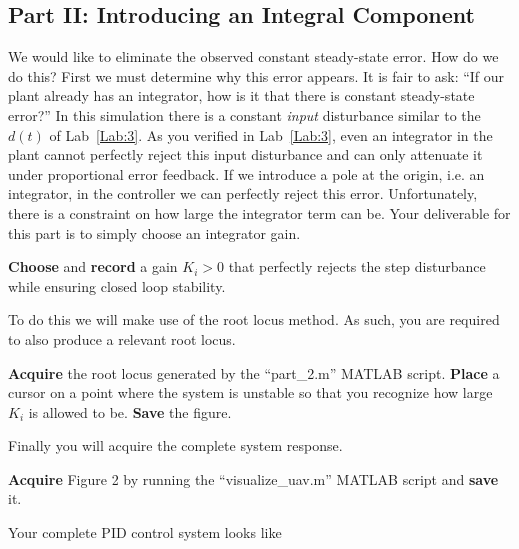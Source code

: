 \subsection{Part II: Introducing an Integral Component}
We would like to eliminate the observed constant steady-state error.
How do we do this?
First we must determine why this error appears.
It is fair to ask:
``If our plant already has an integrator, how is it that there is constant steady-state error?''
In this simulation there is a constant \emph{input} disturbance similar to the \(d(t)\) of Lab~\ref{Lab:3}.
As you verified in Lab~\ref{Lab:3}, even an integrator in the plant cannot perfectly reject this input disturbance and can only attenuate it under proportional error feedback.
If we introduce a pole at the origin, i.e. an integrator, in the controller we can perfectly reject this error.
Unfortunately, there is a constraint on how large the integrator term can be.
Your deliverable for this part is to simply choose an integrator gain.
%
\begin{deliverable}[label={del:lab4:p2:1}]
  \textbf{Choose} and \textbf{record} a gain \(K_i > 0\) that perfectly rejects the step disturbance while ensuring closed loop stability.
\end{deliverable}
%
To do this we will make use of the root locus method.
As such, you are required to also produce a relevant root locus.
%
\begin{deliverable}[label={del:lab4:p2:2}]
  \textbf{Acquire} the root locus generated by the ``part\_2.m'' MATLAB script.
  \textbf{Place} a cursor on a point where the system is unstable so that you recognize how large \(K_i\) is allowed to be.
  \textbf{Save} the figure.
\end{deliverable}
%
Finally you will acquire the complete system response.
%
\begin{deliverable}[label={del:lab4:p2:3}]
  \textbf{Acquire} Figure 2 by running the ``visualize\_uav.m'' MATLAB script and \textbf{save} it.
\end{deliverable}
%
Your complete PID control system looks like
%
